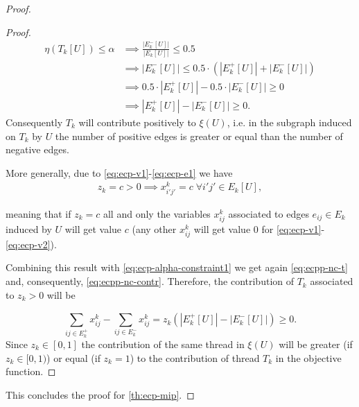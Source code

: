 \begin{proof}
\begin{proof}
		\begin{align}
			\eta(T_k[U]) \leq \alpha & \implies \frac{|E^{-}_{k}[U]|}{|E_{k}[U]|}
			\leq 0.5                                                                                            \\
			                         & \implies |E^{-}_{k}[U]| \leq 0.5 \cdot (|E^{+}_{k}[U]| + |E^{-}_{k}[U]|) \\
			                         & \implies 0.5 \cdot |E^{+}_{k}[U]| - 0.5 \cdot |E^{-}_{k}[U]| \geq 0      \\
			\label{eq:ecpp-nc-contr}
			                         & \implies |E^{+}_{k}[U]| - |E^{-}_{k}[U]|
			\geq 0.
		\end{align}
		Consequently $T_k$ will contribute positively to $\xi(U)$, i.e.
		in the subgraph induced on $T_k$ by $U$
		the number of positive edges is greater or equal than the
		number of negative edges.

		More generally, due to \eqref{eq:ecp-v1}-\eqref{eq:ecp-e1} we have
		\begin{gather*}
			z_k = c > 0 \implies x_{i'j'}^{k} = c \; \forall i'j'
			\in E_k[U],
		\end{gather*}

		meaning that if $z_k = c$ all and only the variables $x_{ij}^{k}$
		associated to edges $e_{ij} \in E_k$ induced by $U$
		will get value $c$ (any other $x_{ij}^{k}$ will get value $0$ for
		\eqref{eq:ecp-v1}-\eqref{eq:ecp-v2}).

		Combining this result with \eqref{eq:ecp-alpha-constraint1} we get
		again \eqref{eq:ecpp-nc-t} and, consequently, \eqref{eq:ecpp-nc-contr}.
		Therefore, the contribution of $T_k$ associated to $z_k > 0$ will be

		\begin{equation}
			\sum^{}_{ij \in E^{+}_k } x_{ij}
				^{k} - \sum_{ij \in E^{-}_k } x_{ij} ^{k} = z_k (|E^{+}_{k}[U]| -
			|E^{-}_{k}[U]|) \geq 0.
		\end{equation}
		Since $z_k \in [0, 1]$ the contribution of the same thread in $\xi(U)$
		will be greater (if $z_k \in [0, 1)$) or equal (if $z_k = 1$) to the
		contribution of thread $T_k$ in the objective function.

	\end{proof}

	This concludes the proof for \autoref{th:ecp-mip}.
\end{proof}

